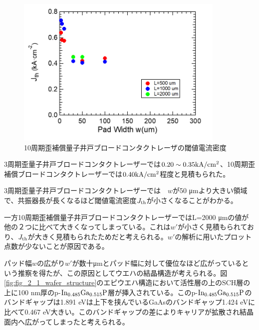 \begin{figure}[h]
	\centering
	\includegraphics[width=10cm]{figure/fig_3_1_10QW_broadcontact_Jth.png}
		\caption{10周期歪補償量子井戸ブロードコンタクトレーザの閾値電流密度}
		\label{fig:fig_3_1_10QW_broadcontact_Jth}
\end{figure}
3周期歪量子井戸ブロードコンタクトレーザーでは$0.20\sim 0.35  \rm{ kA/cm^{2}}$、10周期歪補償ブロードコンタクトレーザーでは$0.40 \rm{ kA/cm^{2}}$程度と見積もられた。

3周期歪量子井戸ブロードコンタクトレーザーでは　$w$が50 \si{\micro\metre}より大きい領域で、共振器長が長くなるほど閾値電流密度$J_{\rm{th}}$が小さくなることがわかる。

一方10周期歪補償量子井戸ブロードコンタクトレーザーではL=2000 \si{\micro\metre}の値が他の２つに比べて大きくなってしまっている。これは$w'$が小さく見積もられており、$J_{\rm{th}}$が大きく見積もられたためだと考えられる。$w'$の解析に用いたプロット点数が少ないことが原因である。

パッド幅$w$の広がり$w'$が数十\si{\micro\metre}とパッド幅に対して優位なほど広がっているという推察を得たが、この原因としてウエハの結晶構造が考えられる。図\ref{fig:fig_2_1_wafer_structure}のエピウエハ構造において活性層の上のSCH層の上に100 nm厚のp-$\rm{In_{0.485}Ga_{0.515}P}$層が挿入されている。このp-$\rm{In_{0.485}Ga_{0.515}P}$のバンドギャップは1.891 eVは上下を挟んでいるGaAsのバンドギャップ1.424 eVに比べて0.467 eV大きい。このバンドギャップの差によりキャリアが拡散され結晶面内へ広がってしまったと考えられる。

\clearpage
